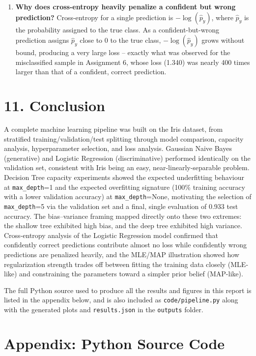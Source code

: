 \documentclass[12pt,a4paper]{article}
\begin{document}
\begin{enumerate}
\item \textbf{Why does cross-entropy heavily penalize a confident but wrong prediction?} Cross-entropy for a single prediction is $-\log(\hat{p}_y)$, where $\hat{p}_y$ is the probability assigned to the true class. As a confident-but-wrong prediction assigns $\hat{p}_y$ close to 0 to the true class, $-\log(\hat{p}_y)$ grows without bound, producing a very large loss -- exactly what was observed for the misclassified sample in Assignment 6, whose loss (1.340) was nearly 400 times larger than that of a confident, correct prediction.
\end{enumerate}

\section*{11. Conclusion}

A complete machine learning pipeline was built on the Iris dataset, from stratified training/validation/test splitting through model comparison, capacity analysis, hyperparameter selection, and loss analysis. Gaussian Naive Bayes (generative) and Logistic Regression (discriminative) performed identically on the validation set, consistent with Iris being an easy, near-linearly-separable problem. Decision Tree capacity experiments showed the expected underfitting behaviour at \texttt{max\_depth}=1 and the expected overfitting signature (100\% training accuracy with a lower validation accuracy) at \texttt{max\_depth}=None, motivating the selection of \texttt{max\_depth}=5 via the validation set and a final, single evaluation of 0.933 test accuracy. The bias--variance framing mapped directly onto these two extremes: the shallow tree exhibited high bias, and the deep tree exhibited high variance. Cross-entropy analysis of the Logistic Regression model confirmed that confidently correct predictions contribute almost no loss while confidently wrong predictions are penalized heavily, and the MLE/MAP illustration showed how regularization strength trades off between fitting the training data closely (MLE-like) and constraining the parameters toward a simpler prior belief (MAP-like).

The full Python source used to produce all the results and figures in this report is listed in the appendix below, and is also included as \texttt{code/pipeline.py} along with the generated plots and \texttt{results.json} in the \texttt{outputs} folder.

\section*{Appendix: Python Source Code}


\end{document}
